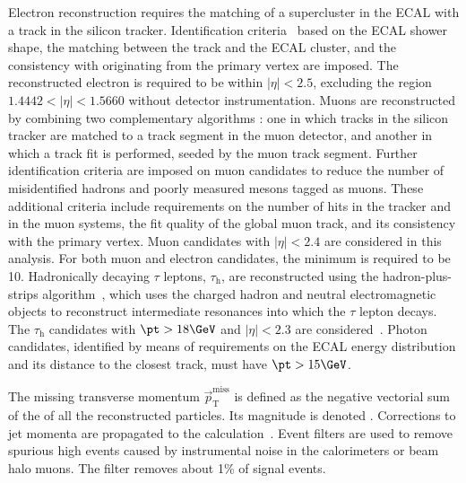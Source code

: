 Electron reconstruction requires the matching of a supercluster in the ECAL with a track in the silicon tracker.
Identification criteria~\cite{Khachatryan:2015hwa} based on the ECAL shower shape, the matching between the track and the ECAL cluster, and the consistency with originating from the primary vertex are imposed. The reconstructed electron is required to be within $|\eta|< 2.5$, excluding the region $1.4442<|\eta|<1.5660$ without detector instrumentation. Muons are reconstructed by combining two complementary algorithms \cite{CMSMuonJINST}:
 one in which tracks in the silicon tracker are matched to a track segment in the muon detector, and another in which a track fit is performed, seeded by the muon track segment.  
Further identification criteria are imposed on muon candidates to reduce the number of misidentified hadrons and poorly measured mesons tagged as muons. 
These additional criteria include requirements on the number of hits in the tracker and in the muon systems, the fit quality of the global muon track, and its consistency with the primary vertex.
Muon candidates with $|\eta|< 2.4$ are considered in this analysis. 
For both muon and electron candidates, the minimum \pt is required to be 10\GeV.
Hadronically decaying $\tau$ leptons, $\tau_\mathrm{h}$, are reconstructed using the hadron-plus-strips
  algorithm~\cite{CMSTauJINST}, which uses the charged hadron and neutral electromagnetic objects 
to reconstruct intermediate resonances into which the $\tau$ lepton decays. The $\tau_\mathrm{h}$
candidates with $\pt>18\GeV$ and $|\eta|< 2.3$ are considered~\cite{Khachatryan:2015hwa,Chatrchyan:2013sba,CMSTauJINST}. Photon candidates, identified by means of requirements on the ECAL energy distribution and its distance to the closest track,  must have $\pt>15\GeV$. %

The missing transverse momentum $\vec{p}_{\mathrm{T}}^{\mathrm{miss}}$ is defined as the negative vectorial sum of the \pt of all the reconstructed particles. Its magnitude is denoted \MET. Corrections to jet momenta are propagated to the \MET calculation~\cite{CMS-PAS-JME-16-004}. Event filters \cite{CMS-PAS-JME-16-004} are used to remove spurious high \MET events caused by instrumental noise in the calorimeters or beam halo muons. The filter removes about 1\% of signal events.

